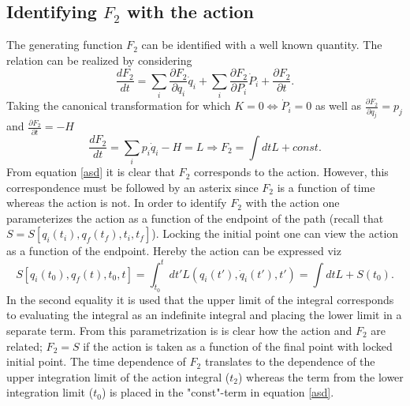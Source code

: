 \subsection{Identifying $F_2$ with the action}
The generating function $F_2$ can be identified with a well known quantity. The relation can be realized by considering
\begin{equation}
	\frac{dF_2}{dt}=\sum_i\frac{\partial F_2}{\partial q_i}\dot{q}_i+\sum_i\frac{\partial F_2}{\partial P_i}\dot{P}_i+\frac{\partial F_2}{\partial t}.
\end{equation} 
Taking the canonical transformation for which $K=0\Leftrightarrow\dot{P}_i=0$ as well as $\frac{\partial F_2}{\partial q_j}=p_j$ and $\frac{\partial F_2}{\partial t}=-H$
\begin{equation}
	\frac{dF_2}{dt}=\sum_ip_i\dot{q}_i-H=L\Rightarrow F_2=\int dtL+const.
	\label{asd}
\end{equation} 
From equation \eqref{asd} it is clear that $F_2$ corresponds to the action. However, this correspondence must be followed by an asterix since $F_2$ is a function of time whereas the action is not. In order to identify $F_2$ with the action one parameterizes the action as a function of the endpoint of the path (recall that $S=S[q_i(t_i),q_f(t_f),t_i,t_f]$). Locking the initial point one can view the action as a function of the endpoint. Hereby the action can be expressed viz
\begin{equation}
	S[q_i(t_0),q_f(t),t_0,t]=\int_{t_0}^{t}dt'L(q_i(t'),\dot{q}_i(t'),t')=\int dt L+S(t_0).
\end{equation} 
In the second equality it is used that the upper limit of the integral corresponds to evaluating the integral as an indefinite integral and placing the lower limit in a separate term. From this parametrization is is clear how the action and $F_2$ are related; $F_2=S$ if the action is taken as a function of the final point with locked initial point. The time dependence of $F_2$ translates to the dependence of the upper integration limit of the action integral ($t_2$) whereas the term from the lower integration limit ($t_0$) is placed in the "const"-term in equation \eqref{asd}.

